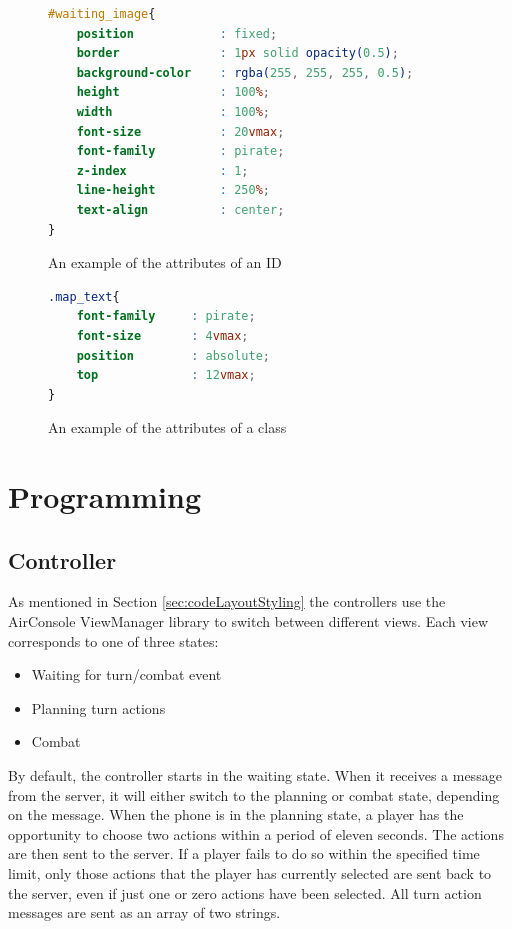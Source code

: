 \begin{figure}
\begin{lstlisting}[language=CSS]
#waiting_image{
	position            : fixed;
	border              : 1px solid opacity(0.5);
	background-color    : rgba(255, 255, 255, 0.5);
	height              : 100%;
	width               : 100%;
	font-size           : 20vmax;
	font-family         : pirate;
	z-index             : 1;
	line-height         : 250%;
	text-align          : center;
}
\end{lstlisting} 
\caption{An example of the attributes of an ID \label{fig:IDex}}
\end{figure}

\begin{figure}
\begin{lstlisting}[language=CSS]
.map_text{
	font-family     : pirate;
	font-size       : 4vmax;
	position        : absolute;
	top	            : 12vmax;
}
\end{lstlisting} 
\caption{An example of the attributes of a class \label{fig:Classex}}
\end{figure}

\section{Programming}\label{sec:codeProgramming}

\subsection{Controller}\label{sec:progController}
As mentioned in Section \ref{sec:codeLayoutStyling} the controllers use the AirConsole ViewManager library to switch between different views. Each view corresponds to one of three states:
\begin{itemize}
	\item Waiting for turn/combat event
	\item Planning turn actions
	\item Combat
\end{itemize}

By default, the controller starts in the waiting state. When it receives a message from the server, it will either switch to the planning or combat state, depending on the message. When the phone is in the planning state, a player has the opportunity to choose two actions within a period of eleven seconds. The actions are then sent to the server. If a player fails to do so within the specified time limit, only those actions that the player has currently selected are sent back to the server, even if just one or zero actions have been selected. All turn action messages are sent as an array of two strings.

